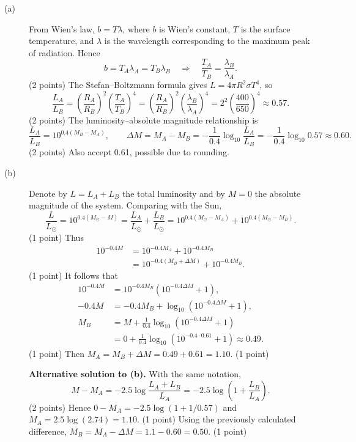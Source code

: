 \begin{description}
\item[(a)] From Wien's law, $b=T\lambda$, where $b$ is Wien's constant, $T$ is the surface temperature, and $\lambda$ is the wavelength corresponding to the maximum peak of radiation. Hence
\[
b=T_A\lambda_A=T_B\lambda_B\quad\Rightarrow\quad\frac{T_A}{T_B}=\frac{\lambda_B}{\lambda_A}.
\]\hfill(2 points)
The Stefan--Boltzmann formula gives $L=4\pi R^2\sigma T^4$, so
\[
\frac{L_A}{L_B}=\left(\frac{R_A}{R_B}\right)^2\left(\frac{T_A}{T_B}\right)^4
=\left(\frac{R_A}{R_B}\right)^2\left(\frac{\lambda_B}{\lambda_A}\right)^4
=2^2\left(\frac{400}{650}\right)^4\approx0.57.
\]\hfill(2 points)
The luminosity--absolute magnitude relationship is
\[
\frac{L_A}{L_B}=10^{0.4(M_B-M_A)},\qquad
\Delta M=M_A-M_B=-\frac{1}{0.4}\log_{10}\frac{L_A}{L_B}
=-\frac{1}{0.4}\log_{10}0.57\approx0.60.
\]\hfill(2 points)
Also accept 0.61, possible due to rounding.
\item[(b)] Denote by $L=L_A+L_B$ the total luminosity and by $M=0$ the absolute magnitude of the system. Comparing with the Sun,
\[
\frac{L}{L_\odot}=10^{0.4(M_\odot-M)}
=\frac{L_A}{L_\odot}+\frac{L_B}{L_\odot}
=10^{0.4(M_\odot-M_A)}+10^{0.4(M_\odot-M_B)}.
\]\hfill(1 point)
Thus
\begin{align*}
10^{-0.4M}&=10^{-0.4M_A}+10^{-0.4M_B}\\
&=10^{-0.4(M_B+\Delta M)}+10^{-0.4M_B}.
\end{align*}\hfill(1 point)
It follows that
\begin{align*}
10^{-0.4M}&=10^{-0.4M_B}(10^{-0.4\Delta M}+1),\\
-0.4M&=-0.4M_B+\log_{10}(10^{-0.4\Delta M}+1),\\
M_B&=M+\frac{1}{0.4}\log_{10}(10^{-0.4\Delta M}+1)\\
&=0+\frac{1}{0.4}\log_{10}(10^{-0.4\cdot0.61}+1)\approx0.49.
\end{align*}\hfill(1 point)
Then $M_A=M_B+\Delta M=0.49+0.61=1.10$. \hfill(1 point)

\textbf{Alternative solution to (b).} With the same notation,
\[
M-M_A=-2.5\log\frac{L_A+L_B}{L_A}=-2.5\log\left(1+\frac{L_B}{L_A}\right).
\]\hfill(2 points)
Hence $0-M_A=-2.5\log(1+1/0.57)$ and $M_A=2.5\log(2.74)=1.10$. \hfill(1 point)
Using the previously calculated difference, $M_B=M_A-\Delta M=1.1-0.60=0.50$. \hfill(1 point)
\end{description}
